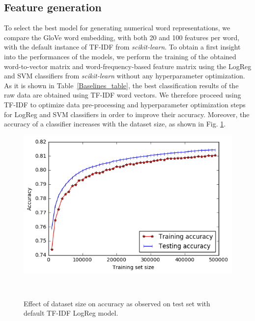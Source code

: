 \subsection{Feature generation}
To select the best model for generating numerical word representations, we compare the GloVe word embedding, with both 20 and 100 features per word, with the default instance of TF-IDF from \textit{scikit-learn}\cite{scikit-learn}.
To obtain a first insight into the performances of the models, we perform the training of the obtained word-to-vector matrix and word-frequency-based feature matrix using the LogReg and SVM classifiers from \textit{scikit-learn} without any hyperparameter optimization. 
As it is shown in Table~\ref{Baselines_table}, the best classification results of the raw data are obtained using TF-IDF word vectors. 
We therefore proceed using TF-IDF to optimize data pre-processing and hyperparameter optimization steps for LogReg and SVM classifiers in order to improve their accuracy.
Moreover, the accuracy of a classifier increases with the dataset size, as shown in Fig. \ref{fig:dataset}.\\
\begin{figure}[h]
        \includegraphics[width=0.965\columnwidth]{plots/data_set_size_vs_accuracy.png}
            \caption{Effect of dataset size on accuracy as observed on test set with default TF-IDF LogReg model.}\label{fig:dataset}
    ~ %
    ~ %
    \
\end{figure}
\vspace{-1cm}
